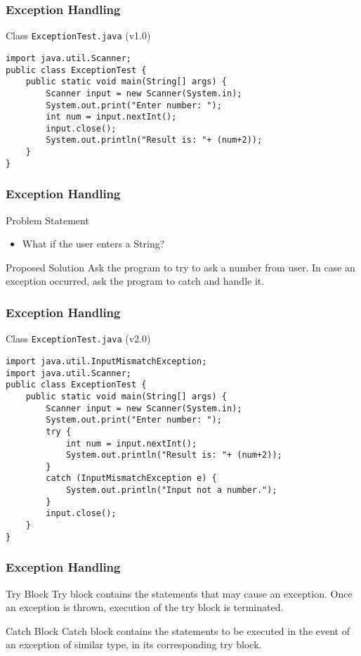 \documentclass[10pt, compress]{beamer}
\begin{document}
\begin{frame}[fragile]
	\frametitle{Exception Handling}
	\begin{block}{Class \texttt{ExceptionTest.java} (v1.0)}
		\begin{verbatim}
import java.util.Scanner;
public class ExceptionTest {
	public static void main(String[] args) {
		Scanner input = new Scanner(System.in);
		System.out.print("Enter number: ");
		int num = input.nextInt();
		input.close();
		System.out.println("Result is: "+ (num+2));
	}
}
		\end{verbatim}
	\end{block}
\end{frame}

\begin{frame}[fragile]
	\frametitle{Exception Handling}
	\begin{block}{Problem Statement}
		\begin{itemize}
			\item[] What if the user enters a String?
		\end{itemize}
	\end{block}
	\begin{block}{Proposed Solution}
		Ask the program to \alert{try} to ask a number from user. In case an exception occurred, ask the program to \alert{catch} and handle it.
	\end{block}
\end{frame}

\begin{frame}[fragile]
	\frametitle{Exception Handling}
	\begin{block}{Class \texttt{ExceptionTest.java} (v2.0)}
		\begin{verbatim}
import java.util.InputMismatchException;
import java.util.Scanner;
public class ExceptionTest {
	public static void main(String[] args) {
		Scanner input = new Scanner(System.in);
		System.out.print("Enter number: ");
		try {
			int num = input.nextInt();
			System.out.println("Result is: "+ (num+2));
		}
		catch (InputMismatchException e) {
			System.out.println("Input not a number.");
		}
		input.close();
	}
}
		\end{verbatim}
	\end{block}
\end{frame}

\begin{frame}[fragile]
	\frametitle{Exception Handling}
	\begin{block}{Try Block}
		Try block contains the statements that may cause an exception. Once an exception is \alert{thrown}, execution of the try block is terminated.
	\end{block}
	\begin{block}{Catch Block}
		Catch block contains the statements to be executed in the event of an exception \alert{of similar type}, in its corresponding try block.
	\end{block}
\end{frame}
\end{document}
